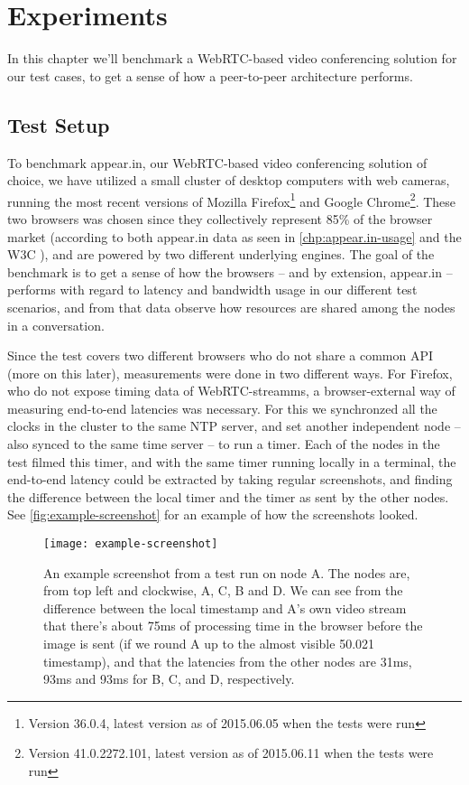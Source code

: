 \chapter{Experiments}\label{chp:experiments}

In this chapter we'll benchmark a WebRTC-based video conferencing solution for our test cases, to get a sense of how a peer-to-peer architecture performs.


\section{Test Setup}

To benchmark appear.in, our WebRTC-based video conferencing solution of choice, we have utilized a small cluster of desktop computers with web cameras, running the most recent versions of Mozilla Firefox\footnote{Version 36.0.4, latest version as of 2015.06.05 when the tests were run} and Google Chrome\footnote{Version 41.0.2272.101, latest version as of 2015.06.11 when the tests were run}. These two browsers was chosen since they collectively represent 85\% of the browser market (according to both appear.in data as seen in \autoref{chp:appear.in-usage} and the W3C \cite{browser-stats}), and are powered by two different underlying engines. The goal of the benchmark is to get a sense of how the browsers -- and by extension, appear.in -- performs with regard to latency and bandwidth usage in our different test scenarios, and from that data observe how resources are shared among the nodes in a conversation.

Since the test covers two different browsers who do not share a common API (more on this later), measurements were done in two different ways. For Firefox, who do not expose timing data of WebRTC-streamms, a browser-external way of measuring end-to-end latencies was necessary. For this we synchronzed all the clocks in the cluster to the same \gls{NTP} server, and set another independent node -- also synced to the same time server -- to run a timer. Each of the nodes in the test filmed this timer, and with the same timer running locally in a terminal, the end-to-end latency could be extracted by taking regular screenshots, and finding the difference between the local timer and the timer as sent by the other nodes. See \autoref{fig:example-screenshot} for an example of how the screenshots looked.

\begin{figure}
    \centering
    \texttt{[image: example-screenshot]}
    \caption{An example screenshot from a test run on node A. The nodes are, from top left and clockwise, A, C, B and D. We can see from the difference between the local timestamp and A's own video stream that there's about 75ms of processing time in the browser before the image is sent (if we round A up to the almost visible 50.021 timestamp), and that the latencies from the other nodes are 31ms, 93ms and 93ms for B, C, and D, respectively.}
    \label{fig:example-screenshot}
\end{figure}

